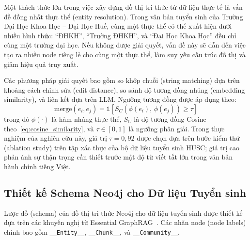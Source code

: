 \documentclass[12pt,a4paper]{report}
\theoremstyle{plain}
\theoremstyle{definition}
\begin{document}
	Một thách thức lớn trong việc xây dựng đồ thị tri thức từ dữ liệu thực tế là
	vấn đề đồng nhất thực thể (entity resolution). Trong văn bản tuyển sinh của
	Trường Đại Học Khoa Học -- Đại Học Huế, cùng một thực thể có thể xuất hiện
	dưới nhiều hình thức: ``ĐHKH'', ``Trường ĐHKH'', và ``Đại Học Khoa Học'' đều
	chỉ cùng một trường đại học. Nếu không được giải quyết, vấn đề này sẽ dẫn đến
	việc tạo ra nhiều node riêng lẻ cho cùng một thực thể, làm suy yếu cấu trúc
	đồ thị và giảm hiệu quả truy xuất.
	
	Các phương pháp giải quyết bao gồm so khớp chuỗi (string matching) dựa trên
	khoảng cách chỉnh sửa (edit distance), so sánh độ tương đồng nhúng (embedding
	similarity), và liên kết dựa trên LLM. Ngưỡng tương đồng được áp dụng theo:
	\begin{equation}
		\text{merge}(e_i, e_j)
		= \mathbb{1}\!\left[
		S_C\!\left(\phi(e_i),\,\phi(e_j)\right) \geq \tau
		\right]
		\label{eq:entity_resolution}
	\end{equation}
	trong đó $\phi(\cdot)$ là hàm nhúng thực thể, $S_C$ là độ tương đồng Cosine
	theo~\eqref{eq:cosine_similarity}, và $\tau \in [0,1]$ là ngưỡng phân giải.
	Trong thực nghiệm của nghiên cứu này, giá trị $\tau = 0{,}92$ được chọn dựa
	trên bước kiểm thử (ablation study) trên tập xác thực của bộ dữ liệu tuyển
	sinh HUSC; giá trị cao phản ánh sự thận trọng cần thiết trước mật độ từ viết
	tắt lớn trong văn bản hành chính tiếng Việt.
	
	\subsection{Thiết kế Schema Neo4j cho Dữ liệu Tuyển sinh}
	\label{subsec:neo4j_schema}
	
	
	Lược đồ (schema) của đồ thị tri thức Neo4j cho dữ liệu tuyển sinh được thiết
	kế dựa trên các khuyến nghị từ Essential GraphRAG~\cite{neo4j2024essential}.
	Các nhãn node (node labels) chính bao gồm \texttt{\_\_Entity\_\_},
	\texttt{\_\_Chunk\_\_}, và \texttt{\_\_Community\_\_}.
	
\end{document}
